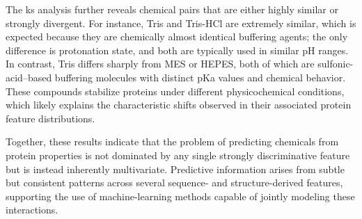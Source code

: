 The \gls{ks} analysis further reveals chemical pairs that are either highly similar or strongly divergent. For instance, Tris and Tris-HCl are extremely similar, which is expected because they are chemically almost identical buffering agents; the only difference is protonation state, and both are typically used in similar pH ranges. In contrast, Tris differs sharply from MES or HEPES, both of which are sulfonic-acid–based buffering molecules with distinct pKa values and chemical behavior. These compounds stabilize proteins under different physicochemical conditions, which likely explains the characteristic shifts observed in their associated protein feature distributions.

Together, these results indicate that the problem of predicting chemicals from protein properties is not dominated by any single strongly discriminative feature but is instead inherently multivariate. Predictive information arises from subtle but consistent patterns across several sequence- and structure-derived features, supporting the use of machine-learning methods capable of jointly modeling these interactions.





